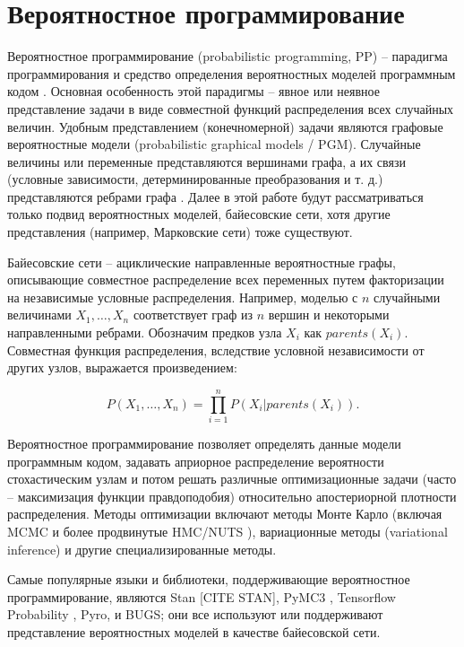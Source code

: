 \documentclass[a4paper,14pt]{extreport}
\begin{document}
\section{Вероятностное программирование}

Вероятностное программирование (probabilistic programming, PP) -- парадигма программирования и средство определения вероятностных моделей программным кодом \cite{intro_to_pp}. Основная особенность этой парадигмы – явное или неявное представление задачи в виде совместной функций распределения всех случайных величин. Удобным представлением (конечномерной) задачи являются графовые вероятностные модели (probabilistic graphical models / PGM). Случайные величины или переменные представляются вершинами графа, а их связи (условные зависимости, детерминированные преобразования и т. д.) представляются ребрами графа \cite{intro_to_pp}. Далее в этой работе будут рассматриваться только подвид вероятностных моделей, байесовские сети, хотя другие представления (например, Марковские сети) тоже существуют.

Байесовские сети -- ациклические направленные вероятностные графы, описывающие совместное распределение всех переменных путем факторизации на независимые условные распределения. Например, моделью с $n$ случайными величинами $X_1, \dots, X_n$ соответствует граф из $n$ вершин и некоторыми направленными ребрами. Обозначим предков узла $X_i$ как $\mathit{parents}(X_i)$. Совместная функция распределения, вследствие условной независимости от других узлов, выражается произведением:

\begin{equation}
	P(X_1, \dots, X_n) = \prod_{i=1}^{n}{P(X_i | \mathit{parents}(X_i))} .
\end{equation}

Вероятностное программирование позволяет определять данные модели программным кодом, задавать априорное распределение вероятности стохастическим узлам и потом решать различные оптимизационные задачи (часто -- максимизация функции правдоподобия) относительно апостериорной плотности распределения. Методы оптимизации включают методы Монте Карло (включая MCMC и более продвинутые HMC/NUTS \cite{nuts_hoffman_gelman}), вариационные методы (variational inference) и другие специализированные методы.

Самые популярные языки и библиотеки, поддерживающие вероятностное программирование, являются Stan [CITE STAN], PyMC3 \cite{pymc3_2016}, Tensorflow Probability \cite{tfp_distributions}, Pyro, и BUGS; они все используют или поддерживают представление вероятностных моделей в качестве байесовской сети.
\end{document}
